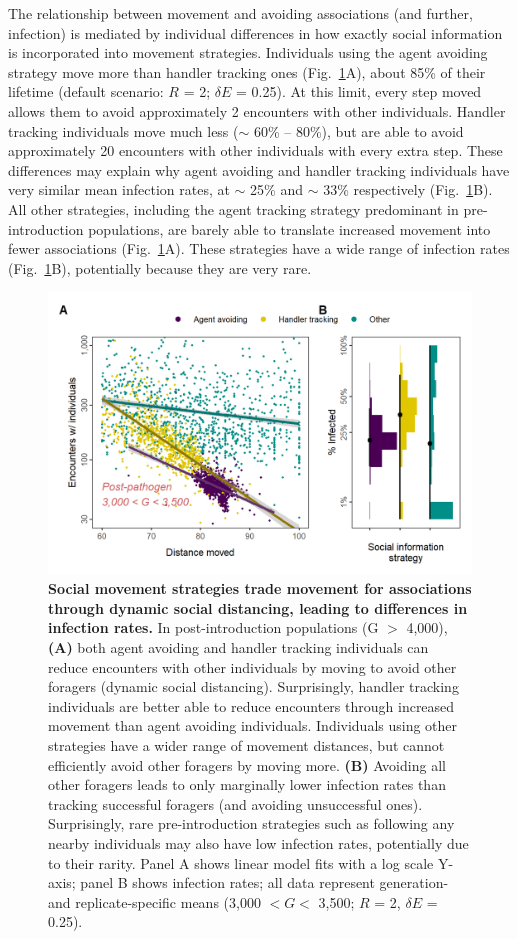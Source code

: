 The relationship between movement and avoiding associations (and further, infection) is mediated by individual differences in how exactly social information is incorporated into movement strategies.
Individuals using the agent avoiding strategy move more than handler tracking ones (Fig.~\ref{patho_fig_02}A), about 85\% of their lifetime (default scenario: $R$ = 2; $\delta E$ = 0.25).
At this limit, every step moved allows them to avoid approximately 2 encounters with other individuals.
Handler tracking individuals move much less ($\sim$ 60\% -- 80\%), but are able to avoid approximately 20 encounters with other individuals with every extra step.
These differences may explain why agent avoiding and handler tracking individuals have very similar mean infection rates, at $\sim$ 25\% and $\sim$ 33\% respectively (Fig.~\ref{patho_fig_02}B).
All other strategies, including the agent tracking strategy predominant in pre-introduction populations, are barely able to translate increased movement into fewer associations (Fig.~\ref{patho_fig_02}A).
These strategies have a wide range of infection rates (Fig.~\ref{patho_fig_02}B), potentially because they are very rare.

\begin{figure}[!h]
    \centering
    \includegraphics[width=0.7\linewidth]{figures/pathomove/fig_02.png}
    \caption{
        \textbf{Social movement strategies trade movement for associations through dynamic social distancing, leading to differences in infection rates.}
        In post-introduction populations (G $>$ 4,000), \textbf{(A)} both agent avoiding and handler tracking individuals can reduce encounters with other individuals by moving to avoid other foragers (dynamic social distancing).
        Surprisingly, handler tracking individuals are better able to reduce encounters through increased movement than agent avoiding individuals.
        Individuals using other strategies have a wider range of movement distances, but cannot efficiently avoid other foragers by moving more.
        \textbf{(B)} Avoiding all other foragers leads to only marginally lower infection rates than tracking successful foragers (and avoiding unsuccessful ones).
        Surprisingly, rare pre-introduction strategies such as following any nearby individuals may also have low infection rates, potentially due to their rarity.
        Panel A shows linear model fits with a log scale Y-axis; panel B shows infection rates; all data represent generation- and replicate-specific means (3,000 $< G <$ 3,500; $R$ = 2, $\delta E$ = 0.25).
    }\label{patho_fig_02}
\end{figure}

